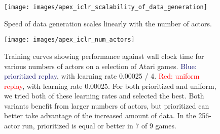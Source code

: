 \documentclass{article} \PassOptionsToPackage{usenames,dvipsnames}{xcolor}
\def\smallcaption#1{\caption{\small #1}\vspace{-0.4cm}}
\begin{document}
\begin{figure}
    \centering
    \texttt{[image: images/apex\_iclr\_scalability\_of\_data\_generation]}
    \smallcaption{Speed of data generation scales linearly with the number of actors.}
    \label{fig:scalability_of_data_generation}
\end{figure}

\begin{figure}
    \centering
    \texttt{[image: images/apex\_iclr\_num\_actors]}
    \smallcaption{Training curves showing performance against wall clock time for various numbers of actors on a selection of Atari games. \textcolor{MidnightBlue}{Blue: prioritized replay}, with learning rate 0.00025 / 4. \textcolor{red}{Red: uniform replay}, with learning rate 0.00025. For both prioritized and uniform, we tried both of these learning rates and selected the best. Both variants benefit from larger numbers of actors, but prioritized can better take advantage of the increased amount of data. In the 256-actor run, prioritized is equal or better in 7 of 9 games.}
    \label{fig:num_actors}
\end{figure}
\end{document}
